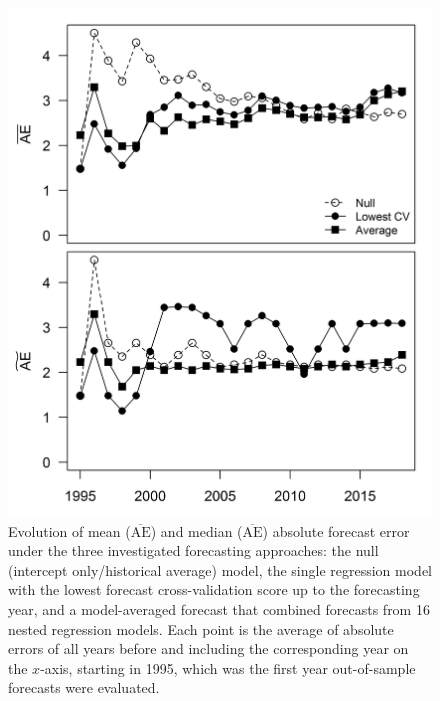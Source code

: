 \documentclass[12pt,]{book}
\theoremstyle{definition}
\theoremstyle{definition}
\theoremstyle{definition}
\theoremstyle{remark}
\begin{document}
\begin{figure}
  \centering
  \includegraphics{img/Ch2/ae-changes.png}
  \caption{Evolution of mean ($\overline{\text{AE}}$) and median ($\overline{\text{AE}}$) absolute forecast error under the three investigated forecasting approaches: the null (intercept only/historical average) model, the single regression model with the lowest forecast cross-validation score up to the forecasting year, and a model-averaged forecast that combined forecasts from 16 nested regression models. Each point is the average of absolute errors of all years before and including the corresponding year on the $x$-axis, starting in 1995, which was the first year out-of-sample forecasts were evaluated.}
  \label{fig:ae-changes}
\end{figure}

\clearpage
\end{document}
